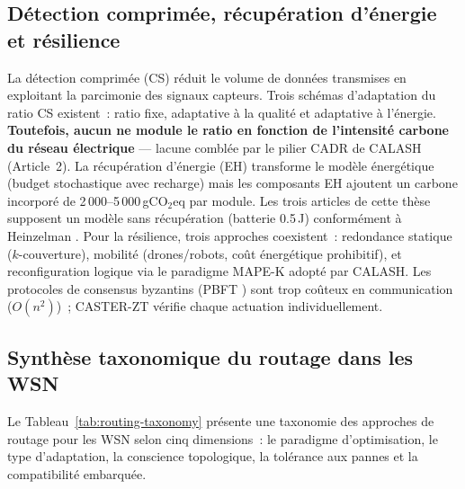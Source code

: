 \subsection{Détection comprimée, récupération d'énergie et résilience}

La détection comprimée (CS) \cite{candes2006cs} réduit le volume de données transmises en exploitant la parcimonie des signaux capteurs. Trois schémas d'adaptation du ratio CS existent~: ratio fixe, adaptative à la qualité et adaptative à l'énergie. \textbf{Toutefois, aucun ne module le ratio en fonction de l'intensité carbone du réseau électrique} --- lacune comblée par le pilier CADR de CALASH (Article~2). La récupération d'énergie (EH) transforme le modèle énergétique (budget stochastique avec recharge) mais les composants EH ajoutent un carbone incorporé de 2\,000--5\,000\,gCO$_2$eq par module. Les trois articles de cette thèse supposent un modèle sans récupération (batterie 0.5\,J) conformément à Heinzelman \cite{heinzelman2000leach}. Pour la résilience, trois approches coexistent~: redondance statique ($k$-couverture), mobilité (drones/robots, coût énergétique prohibitif), et reconfiguration logique via le paradigme MAPE-K adopté par CALASH. Les protocoles de consensus byzantins (PBFT \cite{castro1999pbft}) sont trop coûteux en communication ($O(n^2)$)~; CASTER-ZT vérifie chaque actuation individuellement.

\subsection{Synthèse taxonomique du routage dans les WSN}

Le Tableau~\ref{tab:routing-taxonomy} présente une taxonomie des approches de routage pour les WSN selon cinq dimensions~: le paradigme d'optimisation, le type d'adaptation, la conscience topologique, la tolérance aux pannes et la compatibilité embarquée.

